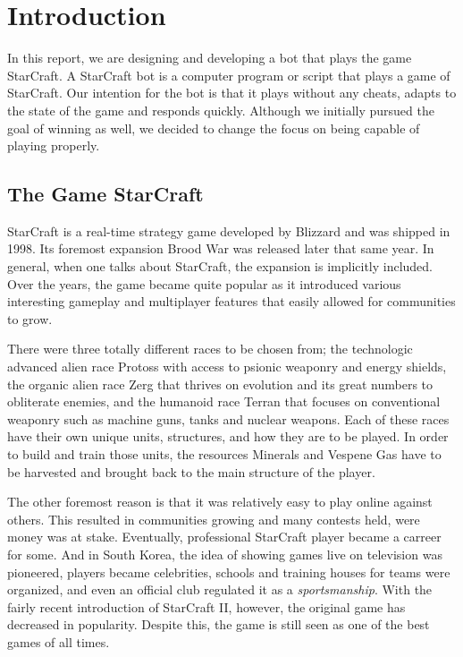 
\chapter{Introduction}

In this report, we are designing and developing a bot that plays the game StarCraft. A StarCraft bot is a computer program or script that plays a game of StarCraft. Our intention for the bot is that it plays without any cheats, adapts to the state of the game and responds quickly. Although we initially pursued the goal of winning as well, we decided to change the focus on being capable of playing properly.

\section{The Game StarCraft}

StarCraft is a real-time strategy game developed by Blizzard and was shipped in 1998. Its foremost expansion Brood War was released later that same year. In general, when one talks about StarCraft, the expansion is implicitly included. Over the years, the game became quite popular as it introduced various interesting gameplay and multiplayer features that easily allowed for communities to grow.

There were three totally different races to be chosen from; the technologic advanced alien race Protoss with access to psionic weaponry and energy shields, the organic alien race Zerg that thrives on evolution and its great numbers to obliterate enemies, and the humanoid race Terran that focuses on conventional weaponry such as machine guns, tanks and nuclear weapons. Each of these races have their own unique units, structures, and how they are to be played. In order to build and train those units, the resources Minerals and Vespene Gas have to be harvested and brought back to the main structure of the player.

The other foremost reason is that it was relatively easy to play online against others. This resulted in communities growing and many contests held, were money was at stake. Eventually, professional StarCraft player became a carreer for some. And in South Korea, the idea of showing games live on television was pioneered, players became celebrities, schools and training houses for teams were organized, and even an official club regulated it as a \emph{sportsmanship}. With the fairly recent introduction of StarCraft II, however, the original game has decreased in popularity. Despite this, the game is still seen as one of the best games of all times.

